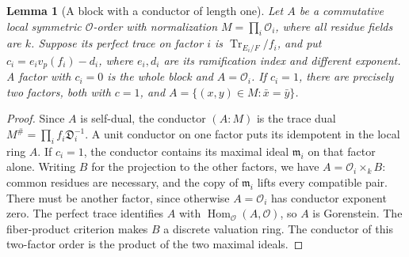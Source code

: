 \documentclass[11pt,a4paper]{article}
\numberwithin{equation}{section}
\newtheorem{lemma}[theorem]{Lemma}
\theoremstyle{remark}
\newcommand{\Hom}{\operatorname{Hom}}
\newcommand{\Tr}{\operatorname{Tr}}
\begin{document}
\begin{lemma}[A block with a conductor of length one]\label{fam:M:2.9}\label{lem:conductor-node}
Let $A$ be a commutative local symmetric $\mathcal O$-order with
normalization $M=\prod_i\mathcal O_i$, where all residue fields
are $k$. Suppose its perfect trace on factor $i$ is
$\Tr_{E_i/F}/f_i$, and put $c_i=e_i v_p(f_i)-d_i$, where $e_i,d_i$
are its ramification index and different exponent. A factor with
$c_i=0$ is the whole block and $A=\mathcal O_i$. If $c_i=1$,
there are precisely two factors, both with $c=1$, and
$A=\{(x,y)\in M:\bar x=\bar y\}$.
\end{lemma}
\begin{proof}
Since $A$ is self-dual, the conductor $(A:M)$ is the trace dual
$M^\#=\prod_i f_i\mathfrak D_i^{-1}$. A unit conductor on one
factor puts its idempotent in the local ring $A$. If $c_i=1$,
the conductor contains its maximal ideal $\mathfrak m_i$ on that
factor alone. Writing $B$ for the projection to the other factors,
we have $A=\mathcal O_i\times_k B$: common residues are necessary,
and the copy of $\mathfrak m_i$ lifts every compatible pair.
There must be another factor, since otherwise $A=\mathcal O_i$
has conductor exponent zero. The perfect trace identifies $A$
with $\Hom_{\mathcal O}(A,\mathcal O)$, so $A$ is Gorenstein.
The fiber-product criterion \cite[Fact~2.6 and Corollary~2.7]{NSTV}
makes $B$ a discrete valuation ring. The conductor of this
two-factor order is the product of the two maximal ideals.
\end{proof}
\end{document}
